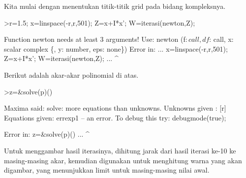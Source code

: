 \documentclass[a4paper,10pt]{article}
\begin{document}
\begin{eulernotebook}
\begin{eulercomment}
\begin{eulercomment}
\begin{eulercomment}
\begin{eulercomment}
\begin{eulercomment}
\begin{eulercomment}
\begin{eulercomment}
\begin{eulercomment}
\begin{eulercomment}
\begin{eulercomment}
\begin{eulercomment}
\begin{eulercomment}
\begin{eulercomment}
\begin{eulercomment}
\begin{eulercomment}
\begin{eulercomment}
\begin{eulercomment}
Kita mulai dengan menentukan titik-titik grid pada bidang kompleksnya.
\end{eulercomment}
\begin{eulerprompt}
>r=1.5; x=linspace(-r,r,501); Z=x+I*x'; W=iterasi(newton,Z);
\end{eulerprompt}
\begin{euleroutput}
  Function newton needs at least 3 arguments!
  Use: newton (f$: call, df$: call, x: scalar complex \{, y: number, eps: none\}) 
  Error in:
  ...  x=linspace(-r,r,501); Z=x+I*x'; W=iterasi(newton,Z); ...
                                                       ^
\end{euleroutput}
\begin{eulercomment}
Berikut adalah akar-akar polinomial di atas.
\end{eulercomment}
\begin{eulerprompt}
>z=&solve(p)()
\end{eulerprompt}
\begin{euleroutput}
  Maxima said:
  solve: more equations than unknowns.
  Unknowns given :  
  [r]
  Equations given:  
  errexp1
   -- an error. To debug this try: debugmode(true);
  
  Error in:
  z=&solve(p)() ...
             ^
\end{euleroutput}
\begin{eulercomment}
Untuk menggambar hasil iterasinya, dihitung jarak dari hasil iterasi
ke-10 ke masing-masing akar, kemudian digunakan untuk menghitung warna
yang akan digambar, yang menunjukkan limit untuk masing-masing nilai
awal.


\end{eulercomment}
\end{eulercomment}
\end{eulercomment}
\end{eulercomment}
\end{eulercomment}
\end{eulercomment}
\end{eulercomment}
\end{eulercomment}
\end{eulercomment}
\end{eulercomment}
\end{eulercomment}
\end{eulercomment}
\end{eulercomment}
\end{eulercomment}
\end{eulercomment}
\end{eulercomment}
\end{eulercomment}
\end{eulernotebook}
\end{document}
